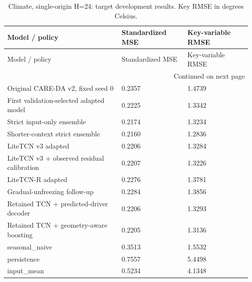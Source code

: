 {\footnotesize
\setlength{\tabcolsep}{3pt}
\renewcommand{\arraystretch}{1.17}
\begin{longtable}{@{}p{}p{}p{}@{}}
\caption{Climate, single-origin H=24: target development results. Key RMSE in degrees Celsius.}\label{tab:long_climate}\\
\toprule
Model / policy & Standardized MSE & Key-variable RMSE \\
\midrule\endfirsthead
Model / policy & Standardized MSE & Key-variable RMSE \\
\midrule\endhead
\midrule\multicolumn{3}{r}{Continued on next page}\\\endfoot
\bottomrule\endlastfoot
Original CARE-DA v2, fixed seed 0 & 0.2357 & 1.4739 \\
First validation-selected adapted model & 0.2225 & 1.3342 \\
Strict input-only ensemble & 0.2174 & 1.3234 \\
Shorter-context strict ensemble & 0.2160 & 1.2836 \\
LiteTCN v3 adapted & 0.2206 & 1.3284 \\
LiteTCN v3 + observed residual calibration & 0.2207 & 1.3226 \\
LiteTCN-R adapted & 0.2276 & 1.3781 \\
Gradual-unfreezing follow-up & 0.2284 & 1.3856 \\
Retained TCN + predicted-driver decoder & 0.2206 & 1.3293 \\
Retained TCN + geometry-aware boosting & 0.2205 & 1.3136 \\
seasonal\_\allowbreak{}naive & 0.3513 & 1.5532 \\
persistence & 0.7557 & 5.4498 \\
input\_\allowbreak{}mean & 0.5234 & 4.1348 \\
\end{longtable}
}
